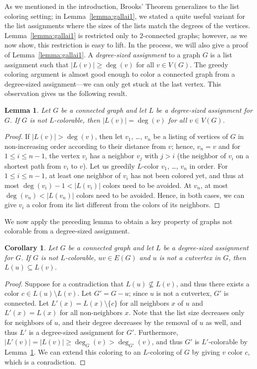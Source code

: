 \documentclass[12pt,twoside,openright,a4paper]{book}
\newtheorem{lemma}[theorem]{Lemma}
\newtheorem{corollary}[theorem]{Corollary}
\begin{document}
As we mentioned in the introduction, Brooks' Theorem generalizes to the list coloring setting;
in Lemma~\ref{lemma:gallai1}, we stated a quite useful variant for the list assignments where the
sizes of the lists match the degrees of the vertices.  Lemma~\ref{lemma:gallai1} is restricted
only to $2$-connected graphs; however, as we now show, this restriction is easy to lift.
In the process, we will also give a proof of Lemma~\ref{lemma:gallai1}.
A \emph{degree-sized assignment} to a graph $G$ is a list assignment such that $|L(v)|\ge \deg(v)$ for all $v\in V(G)$.
The greedy coloring argument is almost good enough to color a connected graph from a degree-sized assignment---we can only get stuck
at the last vertex.  This observation gives us the following result.

\begin{lemma}\label{lemma:gal-trive}
Let $G$ be a connected graph and let $L$ be a degree-sized assignment for $G$.  If $G$ is not $L$-colorable,
then $|L(v)|=\deg(v)$ for all $v\in V(G)$.
\end{lemma}
\begin{proof}
If $|L(v)|>\deg(v)$, then let $v_1$, \ldots, $v_n$ be a listing of vertices of $G$ in non-increasing order
according to their distance from $v$; hence, $v_n=v$ and for $1\le i\le n-1$, the vertex $v_i$ has a neighbor $v_j$
with $j>i$ (the neighbor of $v_i$ on a shortest path from $v_i$ to $v$).  Let us greedily $L$-color $v_1$, \ldots, $v_n$
in order.  For $1\le i\le n-1$, at least one neighbor of $v_i$ has not been colored yet, and thus at most $\deg(v_i)-1<|L(v_i)|$
colors need to be avoided.  At $v_n$, at most $\deg(v_n)<|L(v_n)|$ colors need to be avoided.  Hence, in both cases, we can
give $v_i$ a color from its list different from the colors of its neighbors.
\end{proof}

We now apply the preceding lemma to obtain a key property of graphs not colorable from a degree-sized assignment.

\begin{corollary}\label{cor:gal-adj}
Let $G$ be a connected graph and let $L$ be a degree-sized assignment for $G$.
If $G$ is not $L$-colorable, $uv\in E(G)$ and $u$ is not a cutvertex in $G$,
then $L(u)\subseteq L(v)$.
\end{corollary}
\begin{proof}
Suppose for a contradiction that $L(u)\not\subseteq L(v)$, and thus there exists a color $c\in L(u)\setminus L(v)$.
Let $G'=G-u$; since $u$ is not a cutvertex, $G'$ is connected.
Let $L'(x)=L(x)\setminus\{c\}$ for all neighbors $x$ of $u$ and $L'(x)=L(x)$ for all non-neighbors $x$.
Note that the list size decreases only for neighbors of $u$, and their degree decreases by the removal of $u$ as well,
and thus $L'$ is a degree-sized assignment for $G'$.  Furthermore, $|L'(v)|=|L(v)|\ge \deg_G(v)>\deg_{G'}(v)$,
and thus $G'$ is $L'$-colorable by Lemma~\ref{lemma:gal-trive}.  We can extend this coloring to an $L$-coloring of $G$ by giving $v$ color $c$,
which is a conradiction.
\end{proof}
\end{document}
